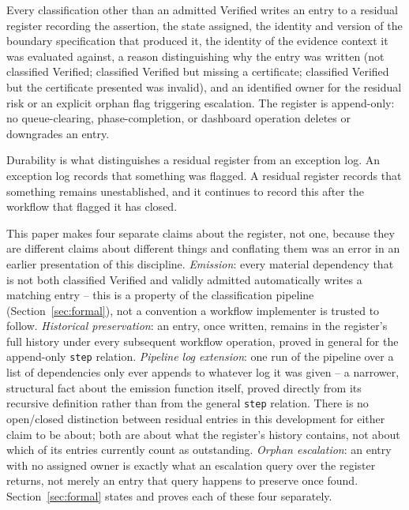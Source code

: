 \documentclass[smallcondensed,envcountsect,natbib]{svjour3}
\newcommand{\state}[1]{\textsf{#1}}
\begin{document}
\begin{definition}
\label{def:register}
Every classification other than an admitted \state{Verified} writes an entry to a residual register recording the assertion, the state assigned, the identity and version of the boundary specification that produced it, the identity of the evidence context it was evaluated against, a reason distinguishing why the entry was written (not classified \state{Verified}; classified \state{Verified} but missing a certificate; classified \state{Verified} but the certificate presented was invalid), and an identified owner for the residual risk or an explicit orphan flag triggering escalation. The register is append-only: no queue-clearing, phase-completion, or dashboard operation deletes or downgrades an entry.
\end{definition}

Durability is what distinguishes a residual register from an exception log. An exception log records that something was flagged. A residual register records that something remains unestablished, and it continues to record this after the workflow that flagged it has closed.

This paper makes four separate claims about the register, not one, because they are different claims about different things and conflating them was an error in an earlier presentation of this discipline. \emph{Emission}: every material dependency that is not both classified \state{Verified} and validly admitted automatically writes a matching entry -- this is a property of the classification pipeline (Section~\ref{sec:formal}), not a convention a workflow implementer is trusted to follow. \emph{Historical preservation}: an entry, once written, remains in the register's full history under every subsequent workflow operation, proved in general for the append-only \texttt{step} relation. \emph{Pipeline log extension}: one run of the pipeline over a list of dependencies only ever appends to whatever log it was given -- a narrower, structural fact about the emission function itself, proved directly from its recursive definition rather than from the general \texttt{step} relation. There is no open/closed distinction between residual entries in this development for either claim to be about; both are about what the register's history contains, not about which of its entries currently count as outstanding. \emph{Orphan escalation}: an entry with no assigned owner is exactly what an escalation query over the register returns, not merely an entry that query happens to preserve once found. Section~\ref{sec:formal} states and proves each of these four separately.
\end{document}

